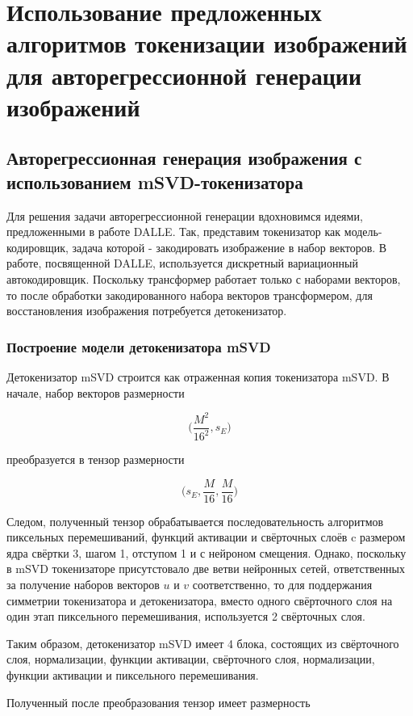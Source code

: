 \documentclass[times,specification,annotation]{itmo-student-thesis}
\begin{document}
\chapter{Использование предложенных алгоритмов токенизации изображений для авторегрессионной генерации изображений}
\section{Авторегрессионная генерация изображения с использованием mSVD-токенизатора}

Для решения задачи авторегрессионной генерации вдохновимся идеями, предложенными в работе DALLE. Так, представим токенизатор как модель-кодировщик, задача которой - закодировать изображение в набор векторов. В работе, посвященной DALLE, используется дискретный вариационный автокодировщик. Поскольку трансформер работает только с наборами векторов, то после обработки закодированного набора векторов трансформером, для восстановления изображения потребуется детокенизатор.

\subsection{Построение модели детокенизатора mSVD}

Детокенизатор mSVD строится как отраженная копия токенизатора mSVD. В начале, набор векторов размерности

$$
\Big(\dfrac{M^2}{16^2}, s_E\Big)
$$

преобразуется в тензор размерности

$$
\Big(s_E, \dfrac{M}{16}, \dfrac{M}{16}\Big)
$$

Следом, полученный тензор обрабатывается последовательность алгоритмов пиксельных перемешиваний, функций активации и свёрточных слоёв c размером ядра свёртки 3, шагом 1, отступом 1 и с нейроном смещения. Однако, поскольку в mSVD токенизаторе присутстовало две ветви нейронных сетей, ответственных за получение наборов векторов $u$ и $v$ соответственно, то для поддержания симметрии токенизатора и детокенизатора, вместо одного свёрточного слоя на один этап пиксельного перемешивания, используется 2 свёрточных слоя.

Таким образом, детокенизатор mSVD имеет 4 блока, состоящих из свёрточного слоя, нормализации, функции активации, свёрточного слоя, нормализации, функции активации и пиксельного перемешивания.

Полученный после преобразования тензор имеет размерность 
\end{document}

